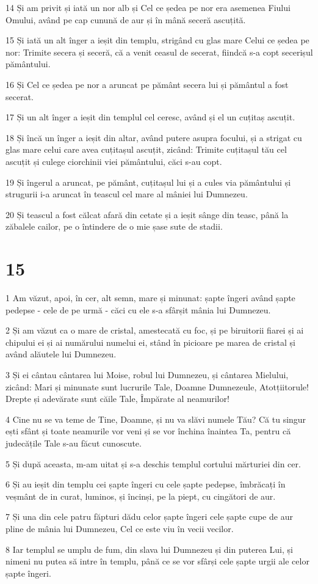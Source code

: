 \par 14 Și am privit și iată un nor alb și Cel ce ședea pe nor era asemenea Fiului Omului, având pe cap cunună de aur și în mână seceră ascuțită.
\par 15 Și iată un alt înger a ieșit din templu, strigând cu glas mare Celui ce ședea pe nor: Trimite secera și seceră, că a venit ceasul de secerat, fiindcă s-a copt secerișul pământului.
\par 16 Și Cel ce ședea pe nor a aruncat pe pământ secera lui și pământul a fost secerat.
\par 17 Și un alt înger a ieșit din templul cel ceresc, având și el un cuțitaș ascuțit.
\par 18 Și încă un înger a ieșit din altar, având putere asupra focului, și a strigat cu glas mare celui care avea cuțitașul ascuțit, zicând: Trimite cuțitașul tău cel ascuțit și culege ciorchinii viei pământului, căci s-au copt.
\par 19 Și îngerul a aruncat, pe pământ, cuțitașul lui și a cules via pământului și strugurii i-a aruncat în teascul cel mare al mâniei lui Dumnezeu.
\par 20 Și teascul a fost călcat afară din cetate și a ieșit sânge din teasc, până la zăbalele cailor, pe o întindere de o mie șase sute de stadii.

\chapter{15}

\par 1 Am văzut, apoi, în cer, alt semn, mare și minunat: șapte îngeri având șapte pedepse - cele de pe urmă - căci cu ele s-a sfârșit mânia lui Dumnezeu.
\par 2 Și am văzut ca o mare de cristal, amestecată cu foc, și pe biruitorii fiarei și ai chipului ei și ai numărului numelui ei, stând în picioare pe marea de cristal și având alăutele lui Dumnezeu.
\par 3 Și ei cântau cântarea lui Moise, robul lui Dumnezeu, și cântarea Mielului, zicând: Mari și minunate sunt lucrurile Tale, Doamne Dumnezeule, Atotțiitorule! Drepte și adevărate sunt căile Tale, Împărate al neamurilor!
\par 4 Cine nu se va teme de Tine, Doamne, și nu va slăvi numele Tău? Că tu singur ești sfânt și toate neamurile vor veni și se vor închina înaintea Ta, pentru că judecățile Tale s-au făcut cunoscute.
\par 5 Și după aceasta, m-am uitat și s-a deschis templul cortului mărturiei din cer.
\par 6 Și au ieșit din templu cei șapte îngeri cu cele șapte pedepse, îmbrăcați în veșmânt de in curat, luminos, și încinși, pe la piept, cu cingători de aur.
\par 7 Și una din cele patru făpturi dădu celor șapte îngeri cele șapte cupe de aur pline de mânia lui Dumnezeu, Cel ce este viu în vecii vecilor.
\par 8 Iar templul se umplu de fum, din slava lui Dumnezeu și din puterea Lui, și nimeni nu putea să intre în templu, până ce se vor sfârși cele șapte urgii ale celor șapte îngeri.

